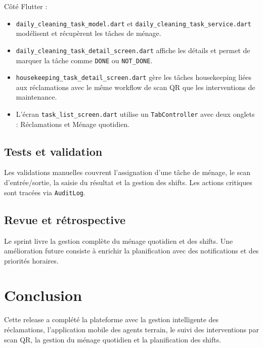 Côté Flutter :
\begin{itemize}
\item \texttt{daily\_cleaning\_task\_model.dart} et \texttt{daily\_cleaning\_task\_service.dart} modélisent et récupèrent les tâches de ménage.
\item \texttt{daily\_cleaning\_task\_detail\_screen.dart} affiche les détails et permet de marquer la tâche comme \texttt{DONE} ou \texttt{NOT\_DONE}.
\item \texttt{housekeeping\_task\_detail\_screen.dart} gère les tâches housekeeping liées aux réclamations avec le même workflow de scan QR que les interventions de maintenance.
\item L'écran \texttt{task\_list\_screen.dart} utilise un \texttt{TabController} avec deux onglets : Réclamations et Ménage quotidien.
\end{itemize}


\subsection{Tests et validation}
Les validations manuelles couvrent l'assignation d'une tâche de ménage, le scan d'entrée/sortie, la saisie du résultat et la gestion des shifts. Les actions critiques sont tracées via \texttt{AuditLog}.

\subsection{Revue et rétrospective}
Le sprint livre la gestion complète du ménage quotidien et des shifts. Une amélioration future consiste à enrichir la planification avec des notifications et des priorités horaires.

\section*{Conclusion}
Cette release a complété la plateforme avec la gestion intelligente des réclamations, l'application mobile des agents terrain, le suivi des interventions par scan QR, la gestion du ménage quotidien et la planification des shifts.
